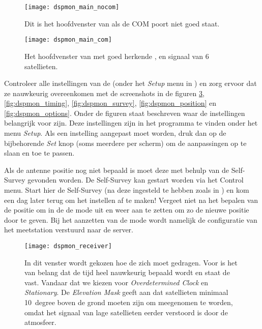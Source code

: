 \begin{figure}
    \centering
    \texttt{[image: dspmon\_main\_nocom]}
    \caption{Dit is het hoofdvenster van \dspmon als de COM poort niet
    goed staat.}
    \label{fig:dspmon_main_nocom}
\end{figure}

\begin{figure}
    \centering
    \texttt{[image: dspmon\_main\_com]}
    \caption{Het hoofdvenster van \dspmon met goed herkende \gps, en
             signaal van 6 satellieten.}
    \label{fig:dspmon_main_com}
\end{figure}

Controleer alle instellingen van de \gps (onder het \emph{Setup} menu in
\dspmon) en zorg ervoor dat ze nauwkeurig overeenkomen met de
screenshots in de figuren \ref{fig:dspmon_receiver},
\ref{fig:dspmon_timing}, \ref{fig:dspmon_survey},
\ref{fig:dspmon_position} en \ref{fig:dspmon_options}. Onder de figuren
staat beschreven waar de instellingen belangrijk voor zijn. Deze
instellingen zijn in het programma te vinden onder het menu
\emph{Setup}. Als een instelling aangepast moet worden, druk dan op de
bijbehorende \emph{Set} knop (soms meerdere per scherm) om de
aanpassingen op te slaan en toe te passen.

Als de \gps antenne positie nog niet bepaald is moet deze met behulp van
de Self-Survey gevonden worden. De Self-Survey kan gestart worden via
het Control menu. Start hier de Self-Survey (na deze ingesteld te hebben
zoals in ) en kom een dag later terug om het
instellen af te maken! Vergeet niet na het bepalen van de positie om in
de \hisparc \daq de \daq mode uit en weer aan te zetten om zo de nieuwe
positie door te geven. Bij het aanzetten van de \daq mode wordt namelijk
de configuratie van het meetstation verstuurd naar de server.

\begin{figure}
    \centering
    \texttt{[image: dspmon\_receiver]}
    \caption{In dit venster wordt gekozen hoe de \gps zich moet gedragen.
    Voor \hisparc is het van belang dat de tijd heel nauwkeurig bepaald
    wordt en staat de \gps vast. Vandaar dat we kiezen voor
    \emph{Overdetermined Clock} en \emph{Stationary}. De \emph{Elevation
    Mask} geeft aan dat satellieten minimaal \SI{10}{degree} boven de
    grond moeten zijn om meegenomen te worden, omdat het signaal van
    lage satellieten eerder verstoord is door de atmosfeer.}
    \label{fig:dspmon_receiver}
\end{figure}

